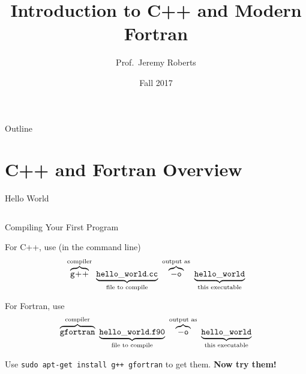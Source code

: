 \documentclass[10pt]{beamer}
\title %
[C++ and Fortran]{Introduction to C++ and Modern Fortran}
\author[Roberts]{Prof.~Jeremy Roberts}
\date
{Fall 2017}
\begin{document}
\begin{frame}[plain]
  \titlepage
\end{frame}

\begin{frame}{Outline}
  \tableofcontents
\end{frame}


\section{C++ and Fortran Overview}

\begin{frame}{Hello World}

\begin{columns}[c]
  \begin{column}{0.5\textwidth}
    
  \end{column}
  \begin{column}{0.5\textwidth}
    
  \end{column}
\end{columns}

\end{frame}

\begin{frame}{Compiling Your First Program}

For C++, use (in the command line)
\begin{equation*}
 \overbrace{\tt g\!+\!+}^{\text{compiler}}~
   \underbrace{\tt{hello\_world.cc}}_{\text{file to compile}}~
     \overbrace{\tt{-o}}^{\text{output as}}~
       \underbrace{\tt{hello\_world}}_{\text{this executable}} 
\end{equation*}
\vfill 

For Fortran, use
\begin{equation*}
 \overbrace{\tt gfortran}^{\text{compiler}}~
   \underbrace{\tt{hello\_world.f90}}_{\text{file to compile}}~
     \overbrace{\tt{-o}}^{\text{output as}}~
       \underbrace{\tt{hello\_world}}_{\text{this executable}} 
\end{equation*}

\vfill 
Use {\tt sudo apt-get install g++ gfortran} to get them.
{\bf Now try them!}

\end{frame}
\end{document}
